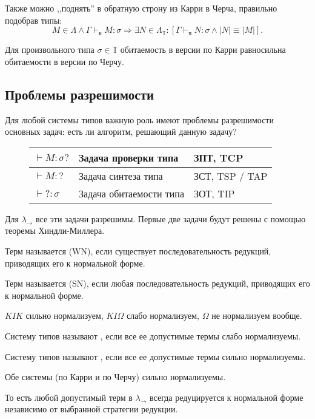 \documentclass[11pt,a4paper]{article}
\begin{document}
Также можно ,,поднять'' в обратную строну из Карри в Черча, правильно подобрав типы:
\[
	M \in \Lambda \wedge \Gamma \vdash_{к} M\colon \sigma  \Longrightarrow \exists N \in \Lambda_{\mathbb{T}} \colon [ \Gamma \vdash_{ч} N\colon \sigma  \wedge  \lvert N \rvert  \equiv \lvert M \rvert ]
.\] 

Для произвольного типа $ \sigma \in \mathbb{T}$ обитаемость в версии по Карри равносильна обитаемости в версии по Черчу.
\subsection{Проблемы разрешимости}
Для любой системы типов важную роль имеют проблемы разрешимости основных задач: есть ли алгоритм, решающий данную задачу?
\begin{figure}[ht]
	\centering
	\begin{tabular}{l|l|l}
		$ \vdash M\colon \sigma ?$ & Задача проверки типа & ЗПТ, TCP \\
		\hline
		$ \vdash M \colon ?$ & Задача синтеза типа & ЗСТ, TSP / TAP \\
		\hline
		$ \vdash ? \colon \sigma $ & Задача обитаемости типа & ЗОТ, TIP
	\end{tabular}
\end{figure}
Для $ \lambda_{\to}$ все эти задачи разрешимы.
Первые две задачи будут решены с помощью теоремы Хиндли-Миллера.

\begin{defn}
	Терм называется  (WN), если существует последовательность редукций, приводящих его к нормальной форме.

	\noindent
	Терм называется  (SN), если любая последовательность редукций, приводящих его к нормальной форме.
\end{defn}
\begin{ex}
    $ KIK$ сильно нормализуем, $ KI \Omega $ слабо нормализуем, $ \Omega $ не нормализуем вообще.
\end{ex}

\begin{defn}
	Систему типов называют , если все ее допустимые термы слабо нормализуемы.

	\noindent
	Систему типов называют , если все ее допустимые термы сильно нормализуемы.
\end{defn}

\begin{thm}
	Обе системы (по Карри и по Черчу) сильно нормализуемы.

	То есть любой допустимый терм в $ \lambda_{\to}$ всегда редуцируется к нормальной форме независимо от выбранной стратегии редукции.
\end{thm}
\end{document}
